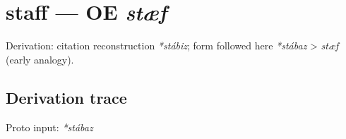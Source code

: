 \documentclass[
  british,
  a4paper,
  openany]{book}
\providecommand{\texorpdfstring}[2]{#1}
\begin{document}
\section{\texorpdfstring{staff --- OE
\emph{stæf}}{staff --- OE stæf}}\label{staff-oe-stuxe6f}


Derivation: citation reconstruction \emph{*stábiz}; form followed here
\emph{*stábaz} \textgreater{} \emph{stæf} (early analogy).

\subsection{Derivation trace}\label{derivation-trace-97}

Proto input: \emph{*stábaz}

\begingroup
\setlength{\fboxsep}{6pt}
\end{document}
